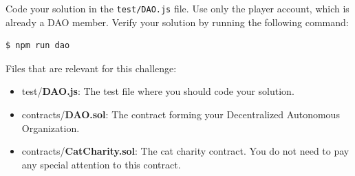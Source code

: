 \documentclass[12pt]{article}
\begin{document}
\noindent
Code your solution in the \texttt{test/DAO.js} file. Use only the player account, which is already a DAO member.  Verify your solution by running the following command:

\begin{verbatim}
$ npm run dao
\end{verbatim}

\noindent
Files that are relevant for this challenge:
\begin{itemize}
    \item test/\textbf{DAO.js}: The test file where you should code your solution.
    \item contracts/\textbf{DAO.sol}: The contract forming your Decentralized Autonomous
          Organization.
    \item contracts/\textbf{CatCharity.sol}: The cat charity contract. You do not need to
          pay any special attention to this contract.
\end{itemize}
\end{document}
